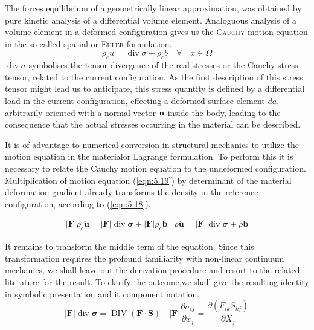 The forces equilibrium of a geometrically linear approximation, was obtained by pure kinetic analysis of a differential volume element. Analoguous analysis of a volume element in a deformed configuration gives us the \textsc{Cauchy} motion equation in the so called spatial or \textsc{Euler} formulation.
\begin{equation}
 \rho_{c} \ddot{u}=\operatorname{div} \sigma+\rho_{c} b \quad \forall \quad x \in \Omega 
 \label{eqn:5.19} 
\end{equation}
$\operatorname{div} \sigma$ symbolises the tensor divergence of the real stresses or the Cauchy stress tensor, related
to the current configuration. As the first description of this stress tensor might lead us to anticipate, this stress quantity is defined by a differential load in the current configuration, effecting
a deformed surface element $da$, arbitrarily oriented with a normal vector $\bf n$ inside the body,
leading to the consequence that the actual stresses occurring in the material can be described.

It is of advantage to numerical conversion in structural mechanics to utilize the motion equation in the materialor Lagrange formulation. To perform this it is necessary to relate the Cauchy
motion equation to the undeformed configuration. Multiplication of motion equation (\ref{eqn:5.19})
by determinant of the material deformation gradient already transforms the density in the
reference configuration, according to (\ref{eqn:5.18}).

\begin{equation}
 \begin{array}{ll}|\boldsymbol{F}| \rho_{c} \ddot{\boldsymbol{u}}=|\boldsymbol{F}| \operatorname{div} \boldsymbol{\sigma}+|\boldsymbol{F}| \rho_{c} \boldsymbol{b} & \rho \ddot{\boldsymbol{u}}=|\boldsymbol{F}| \operatorname{div} \boldsymbol{\sigma}+\rho \boldsymbol{b}\end{array} 
 \label{eqn:5.20} 
\end{equation}

It remains to transform the middle term of the equation. Since this transformation requires the
profound familiarity with non-linear continuum mechanics, we shall leave out the derivation
procedure and resort to the related literature for the result. To clarify the outcome,we shall give the resulting identity in symbolic presentation and it component notation.
\begin{equation}
 |\boldsymbol{F}| \operatorname{div} \boldsymbol{\sigma}=\operatorname{DIV}(\boldsymbol{F} \cdot \boldsymbol{S}) \quad|\boldsymbol{F}| \frac{\partial \sigma_{i j}}{\partial x_{j}}=\frac{\partial\left(F_{i k} S_{k j}\right)}{\partial X_{j}} 
 \label{eqn:5.21} 
\end{equation}

